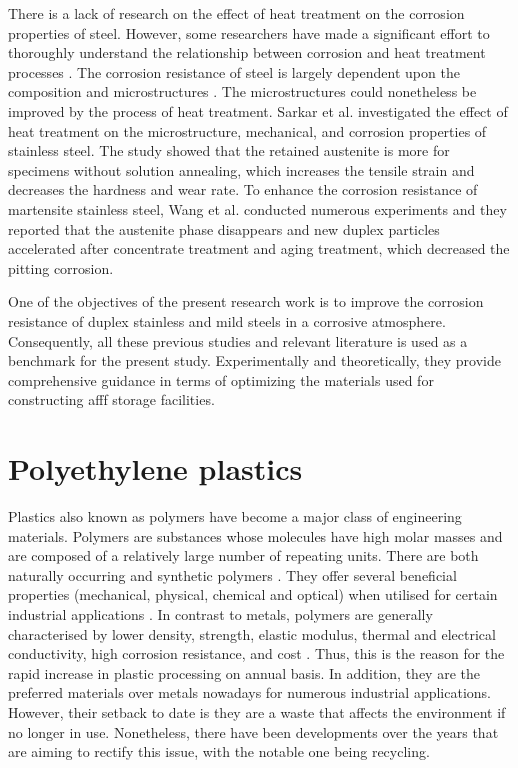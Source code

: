 There is a lack of research on the effect of heat treatment on the corrosion properties of steel. However, some researchers have made a significant effort to thoroughly understand the relationship between corrosion and heat treatment processes \cite{whitman1924effect, hackerman1987theory}. The corrosion resistance of steel is largely dependent upon the composition and microstructures \cite{wang2020enhancing}. The microstructures could nonetheless be improved by the process of heat treatment. Sarkar et al. \cite{sarkar2020effects} investigated the effect of heat treatment on the microstructure, mechanical, and corrosion properties of stainless steel. The study showed that the retained austenite is more for specimens without solution annealing, which increases the tensile strain and decreases the hardness and wear rate. To enhance the corrosion resistance of martensite stainless steel, Wang et al. \cite{wang2020enhancing} conducted numerous experiments and they reported that the austenite phase disappears and new duplex particles accelerated after concentrate treatment and aging treatment, which decreased the pitting corrosion. 

One of the objectives of the present research work is to improve the corrosion resistance of duplex stainless and mild steels in a corrosive atmosphere. Consequently, all these previous studies and relevant literature is used as a benchmark for the present study. Experimentally and theoretically, they provide comprehensive guidance in terms of optimizing the materials used for constructing \acrshort{afff} storage facilities.

\section{Polyethylene plastics}
Plastics also known as polymers have become a major class of engineering materials. Polymers are substances whose molecules have high molar masses and are composed of a relatively large number of repeating units. There are both naturally occurring and synthetic polymers \cite{roslan2013effect}. They offer several beneficial properties (mechanical, physical, chemical and optical) when utilised for certain industrial applications \cite{nugent2017rotational}. In contrast to metals, polymers are generally characterised by lower density, strength, elastic modulus, thermal and electrical conductivity, high corrosion resistance, and cost \cite{roslan2013effect}. Thus, this is the reason for the rapid increase in plastic processing on annual basis. In addition, they are the preferred materials over metals nowadays for numerous industrial applications. However, their setback to date is they are a waste that affects the environment if no longer in use. Nonetheless, there have been developments over the years that are aiming to rectify this issue, with the notable one being recycling.  

